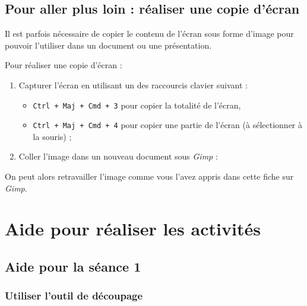 \subsection{Pour aller plus loin : réaliser une copie d'écran}\label{CaptureEcran}

Il est parfois nécessaire de copier le contenu de l'écran sous forme d'image pour pouvoir l'utiliser dans un document ou une présentation.

\vspace{12pt}

Pour réaliser une copie d'écran :

\begin{enumerate}
\item Capturer l'écran en utilisant un des raccourcis clavier suivant :
        \begin{itemize}
        \item \texttt{Ctrl + Maj + Cmd + 3} pour copier la totalité de l'écran,
        \item \texttt{Ctrl + Maj + Cmd + 4} pour copier une partie de l'écran (à sélectionner à la souris) ;
        \end{itemize} 


\item Coller l'image dans un nouveau document sous \emph{Gimp} : 
\end{enumerate}


On peut alors retravailler l'image comme vous l'avez appris dans cette fiche sur \emph{Gimp}. 





\newpage

\section{Aide pour réaliser les activités}

\subsection{Aide pour la séance 1}


\subsubsection{Utiliser l'outil de découpage}\label{correction_gimp01}

